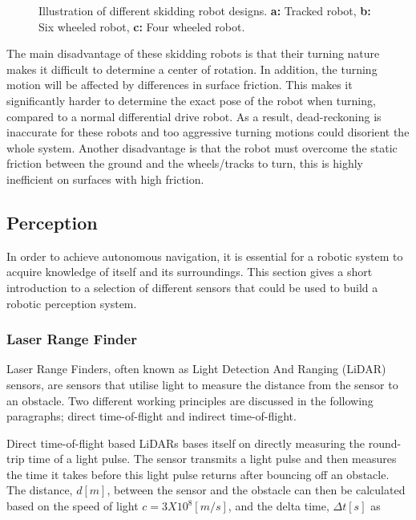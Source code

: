 \begin{figure}[htp]
  \centering
  
  \caption{Illustration of different skidding robot designs. \textbf{a:} Tracked robot, \textbf{b:} Six wheeled robot, \textbf{c:} Four wheeled robot.}
  \label{fig:skidDrive}
\end{figure}
The main disadvantage of these skidding robots is that their turning nature makes it difficult to determine a center of rotation. In addition, the turning motion will be affected by differences in surface friction. This makes it significantly harder to determine the exact pose of the robot when turning, compared to a normal differential drive robot. As a result, dead-reckoning is inaccurate for these robots and too aggressive turning motions could disorient the whole system. Another disadvantage is that the robot must overcome the static friction between the ground and the wheels/tracks to turn, this is highly inefficient on surfaces with high friction.


\subsection{Perception}\label{sec:T:AN:Perception}
In order to achieve autonomous navigation, it is essential for a robotic system to acquire knowledge of itself and its surroundings. This section gives a short introduction to a selection of different sensors that could be used to build a robotic perception system.

\subsubsection{Laser Range Finder}
Laser Range Finders, often known as Light Detection And Ranging (LiDAR) sensors, are sensors that utilise light to measure the distance from the sensor to an obstacle. Two different working principles are discussed in the following paragraphs; direct time-of-flight and indirect time-of-flight.

Direct time-of-flight based LiDARs bases itself on directly measuring the round-trip time of a light pulse. The sensor transmits a light pulse and then measures the time it takes before this light pulse returns after bouncing off an obstacle. The distance, $d[m]$, between the sensor and the obstacle can then be calculated based on the speed of light $c=3X10^8[m/s]$, and the delta time, $\Delta t[s]$ as

